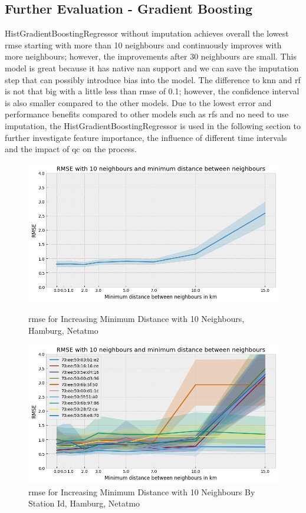 \subsection{Further Evaluation - Gradient Boosting}

HistGradientBoostingRegressor without imputation achieves overall the lowest \gls{rmse} starting with more than 10 neighbours and continuously improves with more neighbours; however, the improvements after 30 neighbours are small. This model is great because it has native \gls{nan} support and we can save the imputation step that can possibly introduce bias into the model. The difference to \gls{knn} and \gls{rf} is not that big with a little less than \gls{rmse} of 0.1; however, the confidence interval is also smaller compared to the other models. Due to the lowest error and performance benefits compared to other models such as \gls{rf}s and no need to use imputation, the HistGradientBoostingRegressor is used in the following section to further investigate feature importance, the influence of different time intervals and the impact of \gls{qc} on the process.\\

\begin{figure}[htp]
    \centering
    \includegraphics[width=1\textwidth]{images/rmse_10_neighbours_min_distance.png}
    \caption{\gls{rmse} for Increasing Minimum Distance with 10 Neighbours, Hamburg, Netatmo}
    \label{fig:eval hamburg minimum distance between stations}

    \centering
    \includegraphics[width=1\textwidth]{images/rmse_10_neighbours_min_distance_by_pid.png}
    \caption{\gls{rmse} for Increasing Minimum Distance with 10 Neighbours By Station Id, Hamburg, Netatmo}
    \label{fig:eval hamburg minimum distance between stations by station id}
\end{figure}

